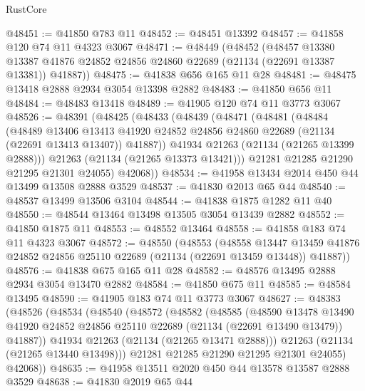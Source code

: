 \begin{lexlean}{RustCore}
\begin{coremodule}
@48451 := @41850 @783 @11
@48452 := @48451 @13392
@48457 := @41858 @120 @74 @11 @4323 @3067
@48471 := @48449
    (@48452
      (@48457
        @13380
        @13387
        @41876
        @24852
        @24856
        @24860
        @22689
        (@21134 (@22691 @13387 @13381))
        @41887))
@48475 := @41838 @656 @165 @11 @28
@48481 := @48475 @13418 @2888 @2934 @3054 @13398 @2882
@48483 := @41850 @656 @11
@48484 := @48483 @13418
@48489 := @41905 @120 @74 @11 @3773 @3067
@48526 := @48391
    (@48425
      (@48433
        (@48439
          (@48471
            (@48481
              (@48484
                (@48489
                  @13406
                  @13413
                  @41920
                  @24852
                  @24856
                  @24860
                  @22689
                  (@21134 (@22691 @13413 @13407))
                  @41887))
              @41934
              @21263
              (@21134 (@21265 @13399 @2888)))
            @21263
            (@21134 (@21265 @13373 @13421)))
          @21281
          @21285
          @21290
          @21295
          @21301
          @24055)
        @42068))
@48534 := @41958 @13434 @2014 @450 @44 @13499 @13508 @2888 @3529
@48537 := @41830 @2013 @65 @44
@48540 := @48537 @13499 @13506 @3104
@48544 := @41838 @1875 @1282 @11 @40
@48550 := @48544 @13464 @13498 @13505 @3054 @13439 @2882
@48552 := @41850 @1875 @11
@48553 := @48552 @13464
@48558 := @41858 @183 @74 @11 @4323 @3067
@48572 := @48550
    (@48553
      (@48558
        @13447
        @13459
        @41876
        @24852
        @24856
        @25110
        @22689
        (@21134 (@22691 @13459 @13448))
        @41887))
@48576 := @41838 @675 @165 @11 @28
@48582 := @48576 @13495 @2888 @2934 @3054 @13470 @2882
@48584 := @41850 @675 @11
@48585 := @48584 @13495
@48590 := @41905 @183 @74 @11 @3773 @3067
@48627 := @48383
    (@48526
      (@48534
        (@48540
          (@48572
            (@48582
              (@48585
                (@48590
                  @13478
                  @13490
                  @41920
                  @24852
                  @24856
                  @25110
                  @22689
                  (@21134 (@22691 @13490 @13479))
                  @41887))
              @41934
              @21263
              (@21134 (@21265 @13471 @2888)))
            @21263
            (@21134 (@21265 @13440 @13498)))
          @21281
          @21285
          @21290
          @21295
          @21301
          @24055)
        @42068))
@48635 := @41958 @13511 @2020 @450 @44 @13578 @13587 @2888 @3529
@48638 := @41830 @2019 @65 @44

\end{coremodule}
\end{lexlean}
